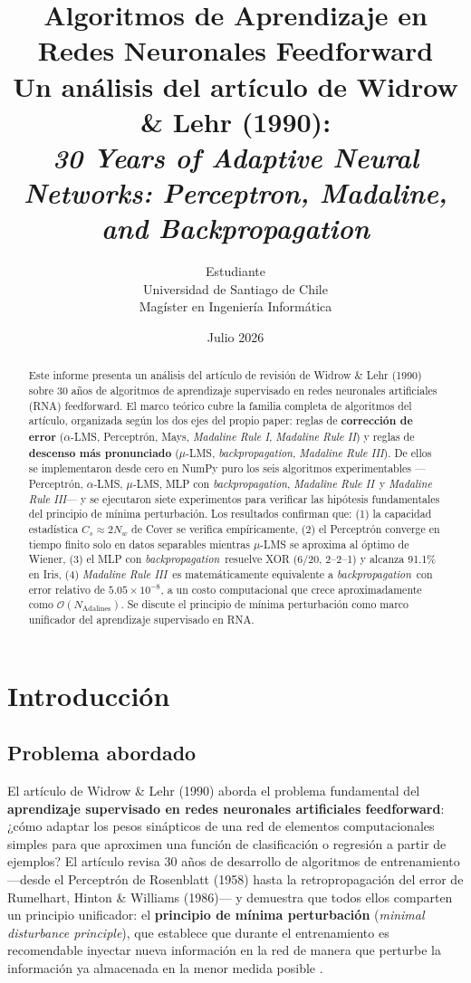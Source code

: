 \documentclass[11pt,a4paper]{article}
\title{\textbf{Algoritmos de Aprendizaje en Redes Neuronales Feedforward}\\[4pt]
\large Un análisis del artículo de Widrow \& Lehr (1990):\\
\textit{30 Years of Adaptive Neural Networks: Perceptron, Madaline, and Backpropagation}}
\author{Estudiante\\Universidad de Santiago de Chile\\Magíster en Ingeniería Informática}
\date{Julio 2026}
\newcommand{\aLMS}{$\alpha$-LMS}
\newcommand{\muLMS}{$\mu$-LMS}
\newcommand{\bp}{\textit{backpropagation}}
\newcommand{\mri}{\textit{Madaline Rule I}}
\newcommand{\mrii}{\textit{Madaline Rule II}}
\newcommand{\mriii}{\textit{Madaline Rule III}}
\begin{document}
\maketitle

\begin{abstract}
Este informe presenta un análisis del artículo de revisión de Widrow \& Lehr (1990)
sobre 30 años de algoritmos de aprendizaje supervisado en redes neuronales artificiales (RNA)
feedforward. El marco teórico cubre la familia completa de algoritmos del artículo, organizada
según los dos ejes del propio paper: reglas de \textbf{corrección de error} (\aLMS, Perceptrón,
Mays, \mri, \mrii) y reglas de \textbf{descenso más pronunciado} (\muLMS, \bp, \mriii). De ellos
se implementaron desde cero en NumPy puro los seis algoritmos experimentables
—Perceptrón, \aLMS, \muLMS, MLP con \bp, \mrii~y \mriii— y se ejecutaron siete experimentos
para verificar las hipótesis fundamentales del principio de mínima perturbación.
Los resultados confirman que: (1) la capacidad estadística $C_s \approx 2N_w$ de Cover se verifica
empíricamente, (2) el Perceptrón converge en tiempo finito solo en datos separables mientras \muLMS
se aproxima al óptimo de Wiener, (3) el MLP con \bp~resuelve XOR (6/20, 2--2--1) y alcanza 91.1\% en
Iris, (4) \mriii~es matemáticamente equivalente a \bp~con error relativo de $5.05 \times 10^{-8}$,
a un costo computacional que crece aproximadamente como $\mathcal{O}(N_{\text{Adalines}})$. Se discute
el principio de mínima perturbación como marco unificador del aprendizaje supervisado en RNA.
\end{abstract}


\section{Introducción}

\subsection{Problema abordado}

El artículo de Widrow \& Lehr (1990) \cite{widrow1990} aborda el problema fundamental del
\textbf{aprendizaje supervisado en redes neuronales artificiales feedforward}: ¿cómo adaptar los
pesos sinápticos de una red de elementos computacionales simples para que aproximen una función
de clasificación o regresión a partir de ejemplos? El artículo revisa 30 años de desarrollo de
algoritmos de entrenamiento —desde el Perceptrón de Rosenblatt (1958) hasta la retropropagación
del error de Rumelhart, Hinton \& Williams (1986)— y demuestra que todos ellos comparten un
principio unificador: el \textbf{principio de mínima perturbación} (\textit{minimal disturbance
principle}), que establece que durante el entrenamiento es recomendable inyectar nueva información
en la red de manera que perturbe la información ya almacenada en la menor medida posible
\cite{widrow1990}.
\end{document}
